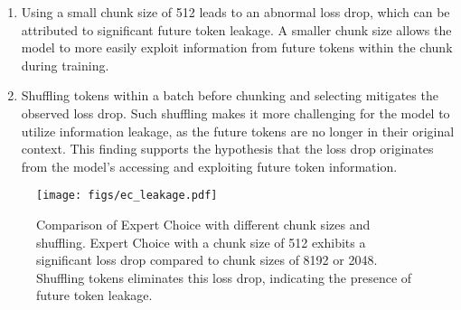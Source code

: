\documentclass{article} %
\begin{document}
\begin{enumerate}
    \item  Using a small chunk size of 512 leads to an abnormal loss drop, which can be attributed to significant future token leakage. A smaller chunk size allows the model to more easily exploit information from future tokens within the chunk during training.
    \item Shuffling tokens within a batch before chunking and selecting mitigates the observed loss drop. Such shuffling makes it more challenging for the model to utilize information leakage, as the future tokens are no longer in their original context. This finding supports the hypothesis that the loss drop originates from the model's accessing and exploiting future token information.
\end{enumerate}



\begin{figure}[t]
\centering
\texttt{[image: figs/ec\_leakage.pdf]}
\caption{Comparison of Expert Choice with different chunk sizes and shuffling. Expert Choice with a chunk size of 512 exhibits a significant loss drop compared to chunk sizes of 8192 or 2048. Shuffling tokens eliminates this loss drop, indicating the presence of future token leakage.}
\label{fig:ec_leakage}
\end{figure}
\end{document}
